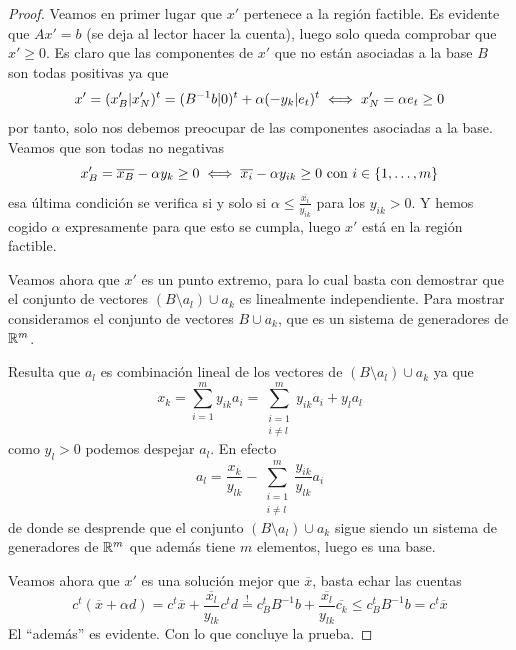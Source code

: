 \begin{proof}
	Veamos en primer lugar que $x'$ pertenece a la región factible. Es evidente que $Ax'=b$ (se deja al lector hacer la cuenta), luego solo queda comprobar que $x'\geq 0$. Es claro que las componentes de $x'$ que no están asociadas a la base $B$ son todas positivas ya que
	\begin{equation*}
		x'=(x_B'|x_N')^t=(B^{-1}b|0)^t+\alpha(-y_k|e_t)^t\iff x_N'=\alpha e_t\geq 0
	\end{equation*}
	por tanto, solo nos debemos preocupar de las componentes asociadas a la base. Veamos que son todas no negativas
	\begin{equation*}
		x_B'=\overline{x_B}-\alpha y_k\geq 0\iff \overline{x_i}-\alpha y_{ik}\geq 0\text{ con } i\in\{1,\dots,m\}
	\end{equation*}
	esa última condición se verifica si y solo si $\alpha\leq \frac{\overline{x_i}}{y_{ik}}$ para los $y_{ik}>0$. Y hemos cogido $\alpha$ expresamente para que esto se cumpla, luego $x'$ está en la región factible.
	
	Veamos ahora que $x'$ es un punto extremo, para lo cual basta con demostrar que el conjunto de vectores $(B\setminus a_l)\cup a_k$ es linealmente independiente. Para mostrar consideramos el conjunto de vectores $B\cup a_k$, que es un sistema de generadores de $\mathbb{R}^m$.
	
	Resulta que $a_l$ es combinación lineal de los vectores de $(B\setminus a_l)\cup a_k$ ya que
	\begin{equation*}
		x_k=\sum_{i=1}^{m}y_{ik}a_i=\sum_{\substack{i=1\\i\not=l}}^{m}y_{ik}a_i+y_la_l
	\end{equation*}
	como $y_l>0$ podemos despejar $a_l$. En efecto
	\begin{equation*}
		a_l=\frac{x_k}{y_{lk}}-\sum_{\substack{i=1\\i\not=l}}^{m}\frac{y_{ik}}{y_{lk}}a_i
	\end{equation*}
	de donde se desprende que el conjunto $(B\setminus a_l)\cup a_k$ sigue siendo un sistema de generadores de $\mathbb{R}^m$ que además tiene $m$ elementos, luego es una base.
	
	Veamos ahora que $x'$ es una solución mejor que $\overline{x}$, basta echar las cuentas
	\begin{equation*}
		c^t(\overline{x}+\alpha d)=c^t\overline{x}+\frac{\overline{x_l}}{y_{lk}}c^td\stackrel{!}{=}c_B^tB^{-1}b+\frac{\overline{x_l}}{y_{lk}}\overline{c_k}\leq c_B^tB^{-1}b=c^t\overline{x}
	\end{equation*}
	El ``además'' es evidente. Con lo que concluye la prueba.
\end{proof}
